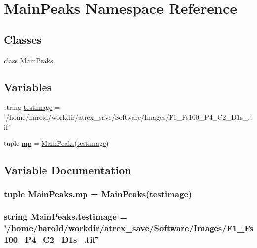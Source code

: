 \hypertarget{namespace_main_peaks}{\section{Main\-Peaks Namespace Reference}
\label{namespace_main_peaks}
}
\subsection*{Classes}
\begin{DoxyCompactItemize}
\item 
class \hyperlink{class_main_peaks_1_1_main_peaks}{Main\-Peaks}
\end{DoxyCompactItemize}
\subsection*{Variables}
\begin{DoxyCompactItemize}
\item 
string \hyperlink{namespace_main_peaks_ad57c7bee83fa5c230b83cbfd6cc2b451}{testimage} = '/home/harold/workdir/atrex\-\_\-save/Software/Images/F1\-\_\-\-Fs100\-\_\-\-P4\-\_\-\-C2\-\_\-\-D1s\-\_.\-tif'
\item 
tuple \hyperlink{namespace_main_peaks_a7fe1f09edf577573e898a6e51ebfe086}{mp} = \hyperlink{class_main_peaks_1_1_main_peaks}{Main\-Peaks}(\hyperlink{namespace_main_peaks_ad57c7bee83fa5c230b83cbfd6cc2b451}{testimage})
\end{DoxyCompactItemize}


\subsection{Variable Documentation}
\hypertarget{namespace_main_peaks_a7fe1f09edf577573e898a6e51ebfe086}{
\subsubsection[{mp}]{\setlength{\rightskip}{0pt plus 5cm}tuple Main\-Peaks.\-mp = {\bf Main\-Peaks}({\bf testimage})}}\label{namespace_main_peaks_a7fe1f09edf577573e898a6e51ebfe086}
\hypertarget{namespace_main_peaks_ad57c7bee83fa5c230b83cbfd6cc2b451}{
\subsubsection[{testimage}]{\setlength{\rightskip}{0pt plus 5cm}string Main\-Peaks.\-testimage = '/home/harold/workdir/atrex\-\_\-save/Software/Images/F1\-\_\-\-Fs100\-\_\-\-P4\-\_\-\-C2\-\_\-\-D1s\-\_.\-tif'}}\label{namespace_main_peaks_ad57c7bee83fa5c230b83cbfd6cc2b451}
